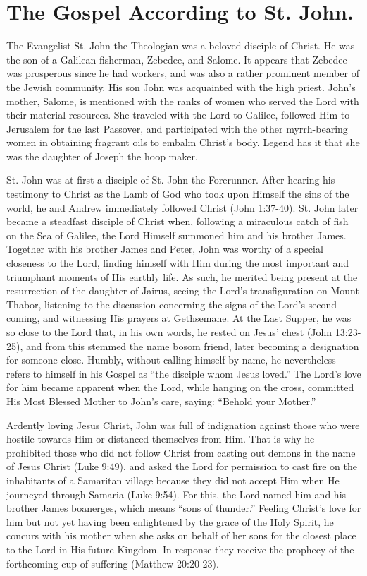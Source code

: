 \section{The Gospel According to St. John.}

The Evangelist St. John the Theologian was a beloved disciple of Christ. He was the son of a Galilean fisherman, Zebedee, and Salome. It appears that Zebedee was prosperous since he had workers, and was also a rather prominent member of the Jewish community. His son John was acquainted with the high priest. John's mother, Salome, is mentioned with the ranks of women who served the Lord with their material resources. She traveled with the Lord to Galilee, followed Him to Jerusalem for the last Passover, and participated with the other myrrh-bearing women in obtaining fragrant oils to embalm Christ's body. Legend has it that she was the daughter of Joseph the hoop maker.

St. John was at first a disciple of St. John the Forerunner. After hearing his testimony to Christ as the Lamb of God who took upon Himself the sins of the world, he and Andrew immediately followed Christ (John 1:37-40). St. John later became a steadfast disciple of Christ when, following a miraculous catch of fish on the Sea of Galilee, the Lord Himself summoned him and his brother James. Together with his brother James and Peter, John was worthy of a special closeness to the Lord, finding himself with Him during the most important and triumphant moments of His earthly life. As such, he merited being present at the resurrection of the daughter of Jairus, seeing the Lord's transfiguration on Mount Thabor, listening to the discussion concerning the signs of the Lord's second coming, and witnessing His prayers at Gethsemane. At the Last Supper, he was so close to the Lord that, in his own words, he rested on Jesus' chest (John 13:23-25), and from this stemmed the name bosom friend, later becoming a designation for someone close. Humbly, without calling himself by name, he nevertheless refers to himself in his Gospel as ``the disciple whom Jesus loved.'' The Lord's love for him became apparent when the Lord, while hanging on the cross, committed His Most Blessed Mother to John's care, saying: ``Behold your Mother.''

Ardently loving Jesus Christ, John was full of indignation against those who were hostile towards Him or distanced themselves from Him. That is why he prohibited those who did not follow Christ from casting out demons in the name of Jesus Christ (Luke 9:49), and asked the Lord for permission to cast fire on the inhabitants of a Samaritan village because they did not accept Him when He journeyed through Samaria (Luke 9:54). For this, the Lord named him and his brother James boanerges, which means ``sons of thunder.'' Feeling Christ's love for him but not yet having been enlightened by the grace of the Holy Spirit, he concurs with his mother when she asks on behalf of her sons for the closest place to the Lord in His future Kingdom. In response they receive the prophecy of the forthcoming cup of suffering (Matthew 20:20-23).

